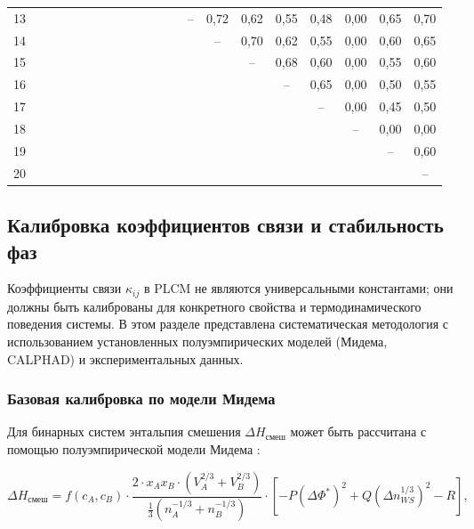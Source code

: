 \documentclass[12pt,a4paper]{article}
\begin{document}
{\begin{longtable}{c|*{20}{c}}
			13 &   &   &   &   &   &   &   &   &   &   &   &   & – & 0,72 & 0,62 & 0,55 & 0,48 & 0,00 & 0,65 & 0,70 \\
			14 &   &   &   &   &   &   &   &   &   &   &   &   &   & – & 0,70 & 0,62 & 0,55 & 0,00 & 0,60 & 0,65 \\
			15 &   &   &   &   &   &   &   &   &   &   &   &   &   &   & – & 0,68 & 0,60 & 0,00 & 0,55 & 0,60 \\
			16 &   &   &   &   &   &   &   &   &   &   &   &   &   &   &   & – & 0,65 & 0,00 & 0,50 & 0,55 \\
			17 &   &   &   &   &   &   &   &   &   &   &   &   &   &   &   &   & – & 0,00 & 0,45 & 0,50 \\
			18 &   &   &   &   &   &   &   &   &   &   &   &   &   &   &   &   &   & – & 0,00 & 0,00 \\
			19 &   &   &   &   &   &   &   &   &   &   &   &   &   &   &   &   &   &   & – & 0,60 \\
			20 &   &   &   &   &   &   &   &   &   &   &   &   &   &   &   &   &   &   &   & – \\
			\bottomrule
	\end{longtable}}
	
	\subsection{Калибровка коэффициентов связи и стабильность фаз}
	\label{subsec:calibration}
	
	Коэффициенты связи \(\kappa_{ij}\) в PLCM не являются универсальными константами; они должны быть калиброваны для конкретного свойства и термодинамического поведения системы. В этом разделе представлена систематическая методология с использованием установленных полуэмпирических моделей (Мидема, CALPHAD) и экспериментальных данных.
	
	\subsubsection{Базовая калибровка по модели Мидема}
	
	Для бинарных систем энтальпия смешения \(\Delta H_{\text{смеш}}\) может быть рассчитана с помощью полуэмпирической модели Мидема \cite{Miedema1980, Takeuchi2010}:
	
	\begin{equation}
		\Delta H_{\text{смеш}} = f(c_A, c_B) \cdot \frac{2 \cdot x_A x_B \cdot (V_A^{2/3} + V_B^{2/3})}{\frac{1}{3}(n_A^{-1/3} + n_B^{-1/3})}
		\cdot \left[ -P (\Delta \Phi^*)^2 + Q (\Delta n_{WS}^{1/3})^2 - R \right],
		\label{eq:miedema}
	\end{equation}
	
\end{document}
